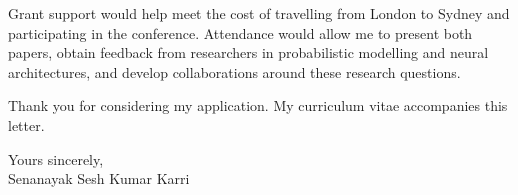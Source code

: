 \documentclass[a4paper,11pt]{article}
\begin{document}
Grant support would help meet the cost of travelling from London to Sydney and participating in the conference. Attendance would allow me to present both papers, obtain feedback from researchers in probabilistic modelling and neural architectures, and develop collaborations around these research questions.

Thank you for considering my application. My curriculum vitae accompanies this letter.

Yours sincerely,\\[3pt]
Senanayak Sesh Kumar Karri
\end{document}
